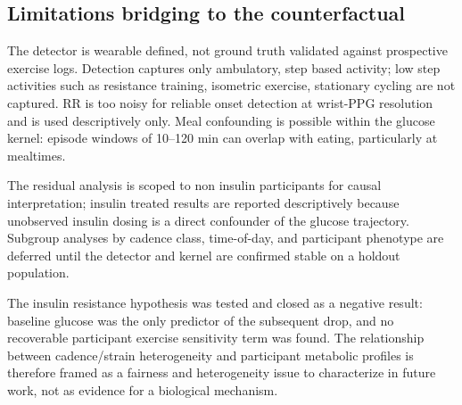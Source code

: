 \subsection{Limitations bridging to the counterfactual}
\label{subsec:ex_limitations}

The detector is wearable defined, not ground truth validated against
prospective exercise logs.
Detection captures only ambulatory, step based activity; low step activities such as resistance training, isometric exercise, stationary cycling are not 
captured.
RR is too noisy for reliable onset detection at wrist-PPG resolution and is
used descriptively only.
Meal confounding is possible within the glucose kernel: episode windows
of 10--120 min can overlap with eating, particularly at mealtimes.

The residual analysis is scoped to non insulin participants for causal
interpretation; insulin treated results are reported descriptively
because unobserved insulin dosing is a direct confounder of the glucose
trajectory.
Subgroup analyses by cadence class, time-of-day, and participant phenotype
are deferred until the detector and kernel are confirmed stable on a
holdout population.

The insulin resistance hypothesis was tested and closed as a negative result:
baseline glucose was the only predictor of the subsequent drop, and no
recoverable participant exercise sensitivity term was found.  The relationship
between cadence/strain heterogeneity and participant metabolic profiles is
therefore framed as a fairness and heterogeneity issue to characterize in
future work, not as evidence for a biological mechanism.


